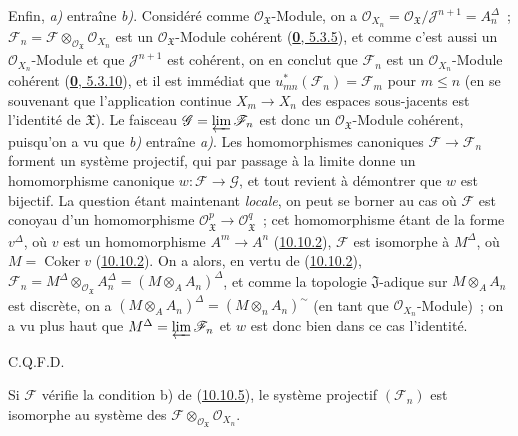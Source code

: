 Enfin, \emph{a)} entraîne \emph{b)}. Considéré comme
$\mathscr{O}_{\mathfrak{X}}$-Module, on a
$\mathscr{O}_{X_n}=\mathscr{O}_{\mathfrak{X}}/
\mathscr{J}^{n+1}=A_n^\Delta$~; $\mathscr{F}_n=\mathscr{F}
\otimes_{\mathscr{O}_{\mathfrak{X}}}\mathscr{O}_{X_n}$ est un
$\mathscr{O}_{\mathfrak{X}}$-Module cohérent
(\hyperref[0.5.3.5-fr]{\textbf{0}, 5.3.5}), et comme c'est aussi un
$\mathscr{O}_{X_n}$-Module et que $\mathscr{J}^{n+1}$ est cohérent,
on en conclut que $\mathscr{F}_n$ est un
$\mathscr{O}_{X_n}$-Module cohérent
(\hyperref[0.5.3.10-fr]{\textbf{0}, 5.3.10}), et il est immédiat que
$u_{mn}^*(\mathscr{F}_n)=\mathscr{F}_m$ pour $m\leq n$ (en se
souvenant que l'application continue $X_m\to X_n$ des espaces
sous-jacents est l'identité de $\mathfrak{X}$). Le faisceau
$\mathscr{G}=\varprojlim\mathscr{F}_n$ est donc un
$\mathscr{O}_{\mathfrak{X}}$-Module cohérent, puisqu'on a vu que \emph{b)}
entraîne \emph{a)}. Les homomorphismes canoniques
$\mathscr{F}\to\mathscr{F}_n$ forment un système projectif, qui par
passage à la limite donne un homomorphisme canonique
$w:\mathscr{F}\to\mathscr{G}$, et tout revient à démontrer que $w$ est
bijectif. La question étant maintenant \emph{locale}, on peut se borner au cas
où $\mathscr{F}$ est conoyau d'un homomorphisme
$\mathscr{O}_{\mathfrak{X}}^p\to\mathscr{O}_{\mathfrak{X}}^q$~; cet
homomorphisme étant de la forme $v^\Delta$, où $v$ est un homomorphisme
$A^m\to A^n$ (\hyperref[I.10.10.2-fr]{10.10.2}), $\mathscr{F}$ est
isomorphe à $M^\Delta$, où $M=\operatorname{Coker}v$
(\hyperref[I.10.10.2-fr]{10.10.2}). On a alors, en vertu de
(\hyperref[I.10.10.2-fr]{10.10.2}),
$\mathscr{F}_n=M^\Delta\otimes_{\mathscr{O}_{\mathfrak{X}}}A_n^\Delta
=(M\otimes_A A_n)^\Delta$, et comme la topologie $\mathfrak{J}$-adique
sur $M\otimes_A A_n$ est discrète, on a
$(M\otimes_A A_n)^\Delta=(M\otimes_n A_n)^{\sim}$ (en tant que
$\mathscr{O}_{X_n}$-Module)~; on a vu plus haut que
$M^\Delta=\varprojlim\mathscr{F}_n$ et $w$ est donc bien dans ce cas
l'identité.
\par\hfill C.Q.F.D.\par

\begin{corollary}[10.10.6]
\label{I.10.10.6-fr}
Si $\mathscr{F}$ vérifie la condition \textup{b)} de
\textup{(\hyperref[I.10.10.5-fr]{10.10.5})}, le système projectif
$(\mathscr{F}_n)$ est isomorphe au système des
$\mathscr{F}\otimes_{\mathscr{O}_{\mathfrak{X}}}\mathscr{O}_{X_n}$.
\end{corollary}

